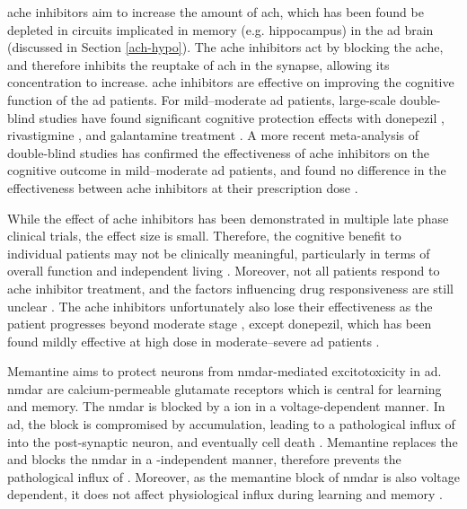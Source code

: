 \Gls{ache} inhibitors aim to increase the amount of \gls{ach}, which has been found be depleted in circuits implicated in memory (e.g. hippocampus) in the \gls{ad} brain (discussed in Section \ref{ach-hypo}). The \gls{ache} inhibitors act by blocking the \gls{ache}, and therefore inhibits the reuptake of \gls{ach} in the synapse, allowing its concentration to increase. \Gls{ache} inhibitors are effective on improving the cognitive function of the \gls{ad} patients. For mild--moderate \gls{ad} patients, large-scale double-blind studies have found significant cognitive protection effects with donepezil \citep{rogers98}, rivastigmine \citep{farlow00}, and galantamine treatment \citep{wilkinson01}. A more recent meta-analysis of double-blind studies has confirmed the effectiveness of \gls{ache} inhibitors on the cognitive outcome in mild--moderate \gls{ad} patients, and found no difference in the effectiveness between \gls{ache} inhibitors at their prescription dose \citep{tan14}.

While the effect of \gls{ache} inhibitors has been demonstrated in multiple late phase clinical trials, the effect size is small. Therefore, the cognitive benefit to individual patients may not be clinically meaningful, particularly in terms of overall function and independent living \citep{lin13}. Moreover, not all patients respond to \gls{ache} inhibitor treatment, and the factors influencing drug responsiveness are still unclear \citep{vanderputt06}. The \gls{ache} inhibitors unfortunately also lose their effectiveness as the patient progresses beyond moderate stage \citep{gillette-guyonnet11}, except donepezil, which has been found mildly effective at high dose in moderate--severe \gls{ad} patients \citep{sabbagh13}. 

Memantine aims to protect neurons from \gls{nmdar}-mediated excitotoxicity in \gls{ad}. \Gls{nmdar} are calcium-permeable glutamate receptors which is central for learning and memory. The \Gls{nmdar} is blocked by a  ion in a voltage-dependent manner. In \gls{ad}, the  block is compromised by \abeta{} accumulation, leading to a pathological influx of  into the post-synaptic neuron, and eventually cell death \citep{danysz12}. Memantine replaces the  and blocks the \gls{nmdar} in a \abeta{}-independent manner, therefore prevents the pathological influx of . Moreover, as the memantine block of \gls{nmdar} is also voltage dependent, it does not affect physiological  influx during learning and memory \citep{danysz12}.

